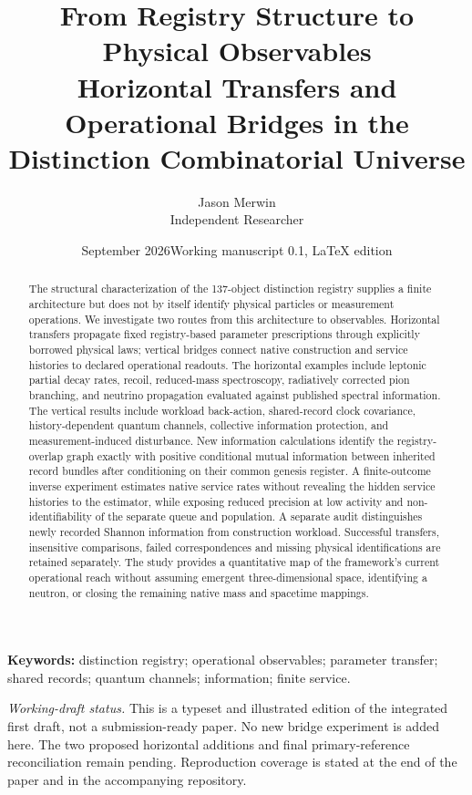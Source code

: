 \documentclass[11pt,a4paper]{article}
\title{\vspace{-1.1em}\textbf{From Registry Structure to Physical Observables}\\[0.45em]\large Horizontal Transfers and Operational Bridges in the\\ Distinction Combinatorial Universe}
\author{Jason Merwin\\\small Independent Researcher}
\date{\small September 2026\quad\textbullet\quad Working manuscript 0.1, LaTeX edition}
\begin{document}
\maketitle
\thispagestyle{plain}
\begin{abstract}
The structural characterization of the 137-object distinction registry supplies a finite architecture but does not by itself identify physical particles or measurement operations. We investigate two routes from this architecture to observables. Horizontal transfers propagate fixed registry-based parameter prescriptions through explicitly borrowed physical laws; vertical bridges connect native construction and service histories to declared operational readouts. The horizontal examples include leptonic partial decay rates, recoil, reduced-mass spectroscopy, radiatively corrected pion branching, and neutrino propagation evaluated against published spectral information. The vertical results include workload back-action, shared-record clock covariance, history-dependent quantum channels, collective information protection, and measurement-induced disturbance. New information calculations identify the registry-overlap graph exactly with positive conditional mutual information between inherited record bundles after conditioning on their common genesis register. A finite-outcome inverse experiment estimates native service rates without revealing the hidden service histories to the estimator, while exposing reduced precision at low activity and non-identifiability of the separate queue and population. A separate audit distinguishes newly recorded Shannon information from construction workload. Successful transfers, insensitive comparisons, failed correspondences and missing physical identifications are retained separately. The study provides a quantitative map of the framework's current operational reach without assuming emergent three-dimensional space, identifying a neutron, or closing the remaining native mass and spacetime mappings.

\end{abstract}
\noindent\textbf{Keywords:} distinction registry; operational observables; parameter transfer; shared records; quantum channels; information; finite service.

\medskip
\noindent\begin{minipage}{\linewidth}\small\textit{Working-draft status.} This is a typeset and illustrated edition of the integrated first draft, not a submission-ready paper. No new bridge experiment is added here. The two proposed horizontal additions and final primary-reference reconciliation remain pending. Reproduction coverage is stated at the end of the paper and in the accompanying repository.\end{minipage}
\medskip
\end{document}
